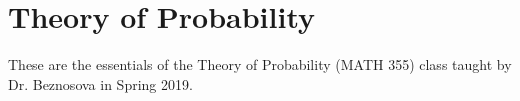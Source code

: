 
\chapter{Theory of Probability}

These are the essentials of the Theory of Probability (MATH 355) class taught by Dr. Beznosova in Spring 2019.





